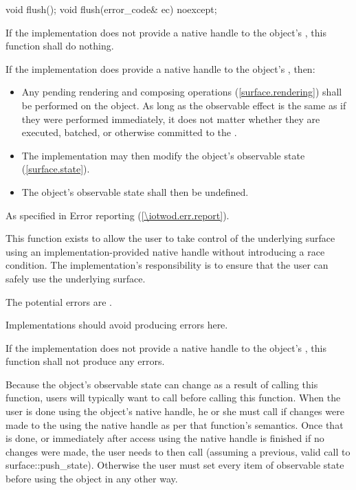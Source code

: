 \begin{itemdecl}
void flush();
void flush(error_code& ec) noexcept;
\end{itemdecl}
\begin{itemdescr}
\pnum
\effects
If the implementation does not provide a native handle to the  object's \underlyingsurface, this function shall do nothing.

\pnum
If the implementation does provide a native handle to the  object's \underlyingsurface, then:
\begin{itemize}
	\item Any pending rendering and composing operations (\ref{surface.rendering}) shall be performed on the  object.
	\enternote
	As long as the observable effect is the same as if they were performed immediately, it does not matter whether they are executed, batched, or otherwise committed to the \underlyingrendandpresenttechs.
	\exitnote
	\item The implementation may then modify the  object's observable state (\ref{surface.state}). 
	\item The  object's observable state shall then be undefined.
\end{itemize}

\pnum
\throws
As specified in Error reporting (\ref{\iotwod.err.report}).

\pnum
\remarks
This function exists to allow the user to take control of the underlying surface using an implementation-provided native handle without introducing a race condition. The implementation's responsibility is to ensure that the user can safely use the underlying surface.

\pnum
\errors
The potential errors are .

\pnum
Implementations should avoid producing errors here.

\pnum
If the implementation does not provide a native handle to the  object's \underlyingsurface, this function shall not produce any errors.

\pnum
\realnotes
Because the  object's observable state can change as a result of calling this function, users will typically want to call  before calling this function. When the user is done using the  object's native handle, he or she must call  if changes were made to the \underlyingsurface using the native handle as per that function's semantics. Once that is done, or immediately after access using the native handle is finished if no changes were made, the user needs to then call  (assuming a previous, valid call to {surface::push_state}). Otherwise the user must set every item of observable state before using the  object in any other way.
\end{itemdescr}

